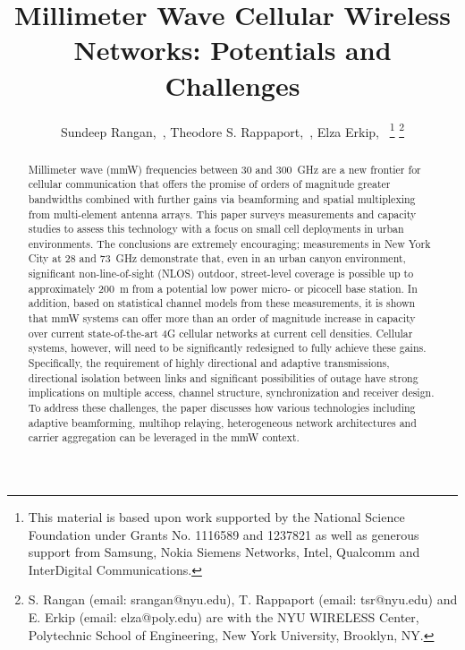 \documentclass[journal]{IEEEtran}
\begin{document}


\title{Millimeter Wave Cellular Wireless Networks:
Potentials and Challenges}


\author{
    Sundeep Rangan,~,
    Theodore S. Rappaport,~,
    Elza Erkip,~
    \thanks{This material is based upon work supported by the National Science
    Foundation under Grants No. 1116589 and 1237821 as well as generous support
    from Samsung, Nokia Siemens Networks, Intel, Qualcomm and InterDigital Communications.}
    \thanks{S. Rangan (email: srangan@nyu.edu), T. Rappaport (email: tsr@nyu.edu) and
            E. Erkip (email: elza@poly.edu) are with the NYU WIRELESS Center,
            Polytechnic School of Engineering, New York University, Brooklyn, NY.}
}

\maketitle

\begin{abstract}
Millimeter wave (mmW) frequencies between 30 and 300~GHz are a
new frontier for cellular communication that offers the promise of
orders of magnitude greater bandwidths combined
with further gains via beamforming and spatial multiplexing
from multi-element antenna arrays.
This paper surveys measurements and capacity studies to
assess this technology with a focus on small cell deployments
in urban environments.
The  conclusions are extremely encouraging;
measurements in New York City at 28 and 73~GHz demonstrate that,
even in an urban canyon environment,
significant non-line-of-sight (NLOS) outdoor, street-level
coverage is possible up to approximately 200~m from a
potential low power micro- or picocell base station.
In addition, based on statistical channel models from these measurements,
it is shown that mmW systems
can offer more than an order of magnitude increase in capacity
over current state-of-the-art 4G cellular networks at current cell densities.
Cellular systems, however, will need to be significantly redesigned
to fully achieve these gains.
Specifically, the requirement of highly directional and adaptive transmissions,
directional isolation between links and significant possibilities of outage
have strong implications on multiple access,
channel structure, synchronization and receiver design.
To address these challenges,  the paper discusses how various
technologies including adaptive beamforming,
multihop relaying, heterogeneous network architectures and carrier aggregation
can be leveraged in the mmW context.
\end{abstract}
\end{document}
